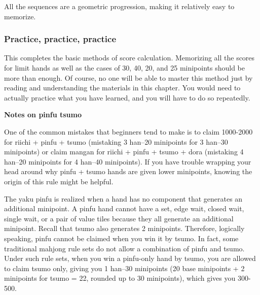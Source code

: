 \bigskip
All the sequences are a geometric progression, making it relatively easy to memorize. 

\bigskip
\subsubsection{Practice, practice, practice}
This completes the basic methods of score calculation. Memorizing all the scores for limit hands as well as the cases of 30, 40, 20, and 25 minipoints should be more than enough. 
Of course, no one will be able to master this method just by reading and understanding the materials in this chapter. You would need to actually practice what you have learned, and you will have to do so repeatedly.

\newpage
\begin{boxnote} \small
{\bf\normalsize Notes on {\jap pinfu tsumo}}

\qquad One of the common mistakes that beginners tend to make is to claim 1000-2000 for riichi + {\jap pinfu + tsumo} (mistaking 3 {\jap han}--20 minipoints for 3 {\jap han}--30 minipoints) or claim {\jap mangan} for riichi + {\jap pinfu + tsumo + dora} (mistaking 4 {\jap han}--20 minipoints for 4 {\jap han}--40 minipoints). 
If you have trouble wrapping your head around why {\jap pinfu + tsumo} hands are given lower minipoints, knowing the origin of this rule might be helpful. 

\qquad The {\jap yaku} {\jap pinfu} is realized when a hand has no component that generates an additional minipoint. A {\jap pinfu} hand cannot have a set, edge wait, closed wait, single wait, or a pair of value tiles because they all generate an additional minipoint. Recall that {\jap tsumo} also generates 2 minipoints. Therefore, logically speaking, {\jap pinfu} cannot be claimed when you win it by {\jap tsumo}. In fact, some traditional mahjong rule sets do not allow a combination of {\jap pinfu} and {\jap tsumo}. 
Under such rule sets, when you win a {\jap pinfu}-only hand by {\jap tsumo}, you are allowed to claim {\jap tsumo} only, giving you 1 {\jap han}--30 minipoints (20 base minipoints + 2 minipoints for {\jap tsumo} = 22, rounded up to 30 minipoints), which gives you 300-500.  


\end{boxnote}
